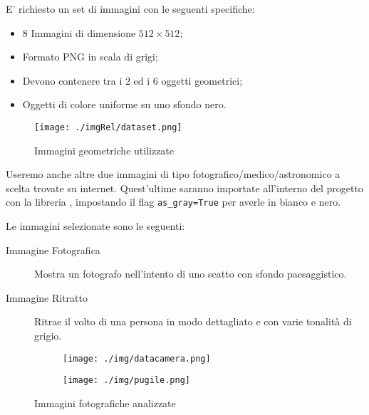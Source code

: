 E' richiesto un set di immagini con le seguenti specifiche: 
\begin{itemize}
    \item 8 Immagini di dimensione $512 \times 512$;
    \item Formato PNG in scala di grigi;
    \item Devono contenere tra i 2 ed i 6 oggetti geometrici;
    \item Oggetti di colore uniforme su uno sfondo nero.
\end{itemize}
\begin{figure}[h]
    \centering
    \texttt{[image: ./imgRel/dataset.png]}\label{fig:datasetgeometriche}
    \caption{Immagini geometriche utilizzate}
\end{figure}
Useremo anche altre due immagini di tipo fotografico/medico/astronomico a scelta trovate su internet.
Quest'ultime saranno importate all'interno del progetto con la libreria , impostando il flag \verb|as_gray=True| per averle in bianco e nero.

Le immagini selezionate sono le seguenti:
\begin{description}
    \item[Immagine Fotografica] Mostra un fotografo nell'intento di uno scatto con sfondo paesaggistico.
    \item[Immagine Ritratto] Ritrae il volto di una persona in modo dettagliato e con varie tonalità di grigio.
\end{description}

\begin{figure}[h]
    \centering
    \begin{subfigure}{0.5\textwidth}
        \centering
        \texttt{[image: ./img/datacamera.png]}\label{fig:giornale}
    \end{subfigure}\hfill
    \begin{subfigure}{0.5\textwidth}
        \centering
        \texttt{[image: ./img/pugile.png]}\label{fig:pugile}
    \end{subfigure}
    
    \caption{Immagini fotografiche analizzate}
\end{figure}
    